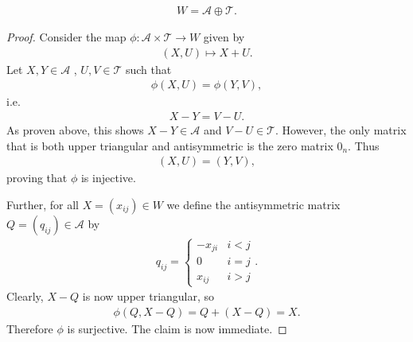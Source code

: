 \documentclass{article}
\begin{document}
\begin{claim*}[1a]
	\begin{align*}
		W=\mathcal{A}\oplus\mathcal{T}.
	\end{align*}
	\begin{proof}
		Consider the map $\phi:\mathcal{A}\times\mathcal{T}\to W$ given by
		\begin{align*}
			(X,U)\mapsto X+U.
		\end{align*}
		Let $X,Y\in\mathcal{A}$ , $U,V\in\mathcal{T}$ such that
		\begin{align*}
			\phi(X,U)=\phi(Y,V),
		\end{align*}
		i.e.
		\begin{align*}
			X-Y=V-U.
		\end{align*}
		As proven above, this shows $X-Y\in\mathcal{A}$ and $V-U\in\mathcal{T}$. However, the only matrix
		that is both upper triangular and antisymmetric is the zero matrix $0_n$.
		Thus
		\begin{align*}
			(X,U)=(Y,V),
		\end{align*}
		proving that $\phi$ is injective.

		Further, for all $X=(x_{ij})\in W$ we define the antisymmetric matrix $Q=(q_{ij})\in\mathcal{A}$
		by
		\begin{align*}
			q_{ij}=\begin{cases}
				-x_{ji} & i<j \\
				0       & i=j \\
				x_{ij}  & i>j
			\end{cases}.
		\end{align*}
		Clearly, $X-Q$ is now upper triangular, so
		\begin{align*}
			\phi(Q,X-Q)=Q+(X-Q)=X.
		\end{align*}
		Therefore $\phi$ is surjective. The claim is now immediate.
	\end{proof}
\end{claim*}
\end{document}
